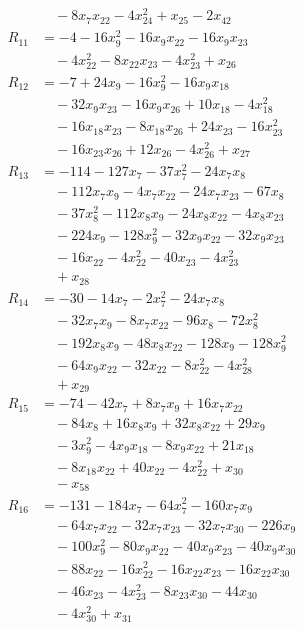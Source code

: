 \begin{align*}
&\quad{}-8x_{7}x_{22}-4x_{24}^{2}+x_{25}-2x_{42}\\
R_{11}&=-4-16x_{9}^{2}-16x_{9}x_{22}-16x_{9}x_{23}\\
&\quad{}-4x_{22}^{2}-8x_{22}x_{23}-4x_{23}^{2}+x_{26}\\
R_{12}&=-7+24x_{9}-16x_{9}^{2}-16x_{9}x_{18}\\
&\quad{}-32x_{9}x_{23}-16x_{9}x_{26}+10x_{18}-4x_{18}^{2}\\
&\quad{}-16x_{18}x_{23}-8x_{18}x_{26}+24x_{23}-16x_{23}^{2}\\
&\quad{}-16x_{23}x_{26}+12x_{26}-4x_{26}^{2}+x_{27}\\
R_{13}&=-114-127x_{7}-37x_{7}^{2}-24x_{7}x_{8}\\
&\quad{}-112x_{7}x_{9}-4x_{7}x_{22}-24x_{7}x_{23}-67x_{8}\\
&\quad{}-37x_{8}^{2}-112x_{8}x_{9}-24x_{8}x_{22}-4x_{8}x_{23}\\
&\quad{}-224x_{9}-128x_{9}^{2}-32x_{9}x_{22}-32x_{9}x_{23}\\
&\quad{}-16x_{22}-4x_{22}^{2}-40x_{23}-4x_{23}^{2}\\
&\quad{}+x_{28}\\
R_{14}&=-30-14x_{7}-2x_{7}^{2}-24x_{7}x_{8}\\
&\quad{}-32x_{7}x_{9}-8x_{7}x_{22}-96x_{8}-72x_{8}^{2}\\
&\quad{}-192x_{8}x_{9}-48x_{8}x_{22}-128x_{9}-128x_{9}^{2}\\
&\quad{}-64x_{9}x_{22}-32x_{22}-8x_{22}^{2}-4x_{28}^{2}\\
&\quad{}+x_{29}\\
R_{15}&=-74-42x_{7}+8x_{7}x_{9}+16x_{7}x_{22}\\
&\quad{}-84x_{8}+16x_{8}x_{9}+32x_{8}x_{22}+29x_{9}\\
&\quad{}-3x_{9}^{2}-4x_{9}x_{18}-8x_{9}x_{22}+21x_{18}\\
&\quad{}-8x_{18}x_{22}+40x_{22}-4x_{22}^{2}+x_{30}\\
&\quad{}-x_{58}\\
R_{16}&=-131-184x_{7}-64x_{7}^{2}-160x_{7}x_{9}\\
&\quad{}-64x_{7}x_{22}-32x_{7}x_{23}-32x_{7}x_{30}-226x_{9}\\
&\quad{}-100x_{9}^{2}-80x_{9}x_{22}-40x_{9}x_{23}-40x_{9}x_{30}\\
&\quad{}-88x_{22}-16x_{22}^{2}-16x_{22}x_{23}-16x_{22}x_{30}\\
&\quad{}-46x_{23}-4x_{23}^{2}-8x_{23}x_{30}-44x_{30}\\
&\quad{}-4x_{30}^{2}+x_{31}\\

\end{align*}
